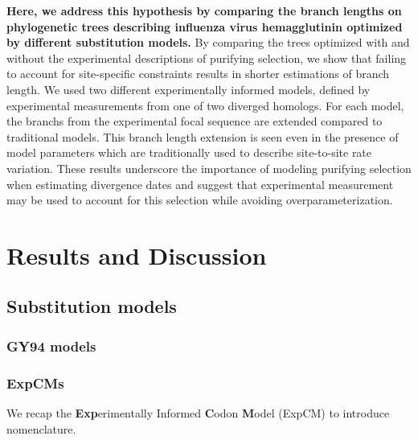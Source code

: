 \documentclass[11pt]{article}
\begin{document}
\textbf{Here, we address this hypothesis by comparing the branch lengths on phylogenetic trees describing influenza virus hemagglutinin optimized by different substitution models.}
By comparing the trees optimized with and without the experimental descriptions of purifying selection, we show that failing to account for site-specific constraints results in shorter estimations of branch length. 
We used two different experimentally informed models, defined by experimental measurements from one of two diverged homologs. 
For each model, the branchs from the experimental focal sequence are extended compared to traditional models.  
This branch length extension is seen even in the presence of model parameters which are traditionally used to describe site-to-site rate variation.  
These results underscore the importance of modeling purifying selection when estimating divergence dates and suggest that experimental measurement may be used to account for this selection while avoiding overparameterization. 

\section*{Results and Discussion}

\subsection*{Substitution models}
\subsubsection*{GY94 models}
\subsubsection*{ExpCMs}
We recap the \textbf{Exp}erimentally Informed \textbf{C}odon \textbf{M}odel (ExpCM) \citep{bloom2014experimentally,bloom2014informed,bloom2017identification,hilton2017phydms} to introduce nomenclature. 
\end{document}
